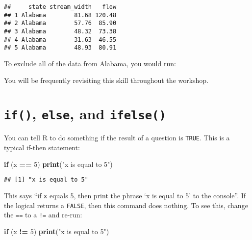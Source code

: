 \documentclass[]{book}
\newenvironment{Shaded}{\begin{snugshade}}{\end{snugshade}}
\newcommand{\ControlFlowTok}[1]{\textcolor[rgb]{0.13,0.29,0.53}{\textbf{#1}}}
\newcommand{\DecValTok}[1]{\textcolor[rgb]{0.00,0.00,0.81}{#1}}
\newcommand{\KeywordTok}[1]{\textcolor[rgb]{0.13,0.29,0.53}{\textbf{#1}}}
\newcommand{\NormalTok}[1]{#1}
\newcommand{\OperatorTok}[1]{\textcolor[rgb]{0.81,0.36,0.00}{\textbf{#1}}}
\newcommand{\StringTok}[1]{\textcolor[rgb]{0.31,0.60,0.02}{#1}}
\begin{document}
\begin{verbatim}
##     state stream_width   flow
## 1 Alabama        81.68 120.48
## 2 Alabama        57.76  85.90
## 3 Alabama        48.32  73.38
## 4 Alabama        31.63  46.55
## 5 Alabama        48.93  80.91
\end{verbatim}

To exclude all of the data from Alabama, you would run:

\begin{Shaded}
\end{Shaded}

You will be frequently revisiting this skill throughout the workshop.

\hypertarget{if-else-and-ifelse}{%
\section{\texorpdfstring{\texttt{if()}, \texttt{else}, and \texttt{ifelse()}}{if(), else, and ifelse()}}\label{if-else-and-ifelse}}

You can tell R to do something if the result of a question is \texttt{TRUE}. This is a typical if-then statement:

\begin{Shaded}
\begin{Highlighting}[]
\ControlFlowTok{if}\NormalTok{ (x }\OperatorTok{==}\StringTok{ }\DecValTok{5}\NormalTok{) }\KeywordTok{print}\NormalTok{(}\StringTok{"x is equal to 5"}\NormalTok{)}
\end{Highlighting}
\end{Shaded}

\begin{verbatim}
## [1] "x is equal to 5"
\end{verbatim}

This says ``if \texttt{x} equals 5, then print the phrase `x is equal to 5' to the console''. If the logical returns a \texttt{FALSE}, then this command does nothing. To see this, change the \texttt{==} to a \texttt{!=} and re-run:

\begin{Shaded}
\begin{Highlighting}[]
\ControlFlowTok{if}\NormalTok{ (x }\OperatorTok{!=}\StringTok{ }\DecValTok{5}\NormalTok{) }\KeywordTok{print}\NormalTok{(}\StringTok{"x is equal to 5"}\NormalTok{)}
\end{Highlighting}
\end{Shaded}
\end{document}
